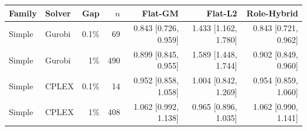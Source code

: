\begin{tabular}{llrrrrr}
\toprule
Family & Solver & Gap & $n$ & Flat-GM & Flat-L2 & Role-Hybrid \\
\midrule
Simple & Gurobi & 0.1\% & 69 & 0.843 [0.726, 0.959] & 1.433 [1.162, 1.780] & 0.843 [0.721, 0.962] \\
Simple & Gurobi & 1\% & 490 & 0.899 [0.845, 0.955] & 1.589 [1.448, 1.744] & 0.902 [0.849, 0.960] \\
Simple & CPLEX & 0.1\% & 14 & 0.952 [0.858, 1.058] & 1.004 [0.842, 1.269] & 0.954 [0.859, 1.060] \\
Simple & CPLEX & 1\% & 408 & 1.062 [0.992, 1.138] & 0.965 [0.896, 1.035] & 1.062 [0.990, 1.141] \\
\bottomrule
\end{tabular}
